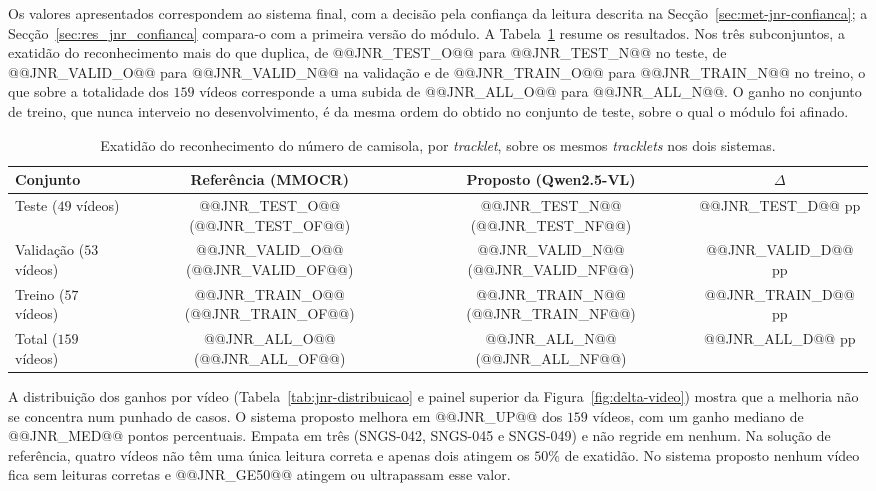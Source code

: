 Os valores apresentados correspondem ao sistema final, com a decisão pela confiança da leitura descrita
na Secção~\ref{sec:met-jnr-confianca}; a Secção~\ref{sec:res_jnr_confianca} compara-o com a primeira
versão do módulo. A Tabela~\ref{tab:jnr} resume os resultados. Nos três subconjuntos, a exatidão do reconhecimento mais
do que duplica, de @@JNR_TEST_O@@ para @@JNR_TEST_N@@ no teste, de @@JNR_VALID_O@@ para
@@JNR_VALID_N@@ na validação e de @@JNR_TRAIN_O@@ para @@JNR_TRAIN_N@@ no treino, o que sobre a
totalidade dos $159$ vídeos corresponde a uma subida de @@JNR_ALL_O@@ para @@JNR_ALL_N@@. O ganho no
conjunto de treino, que nunca interveio no desenvolvimento, é da mesma ordem do obtido no conjunto de
teste, sobre o qual o módulo foi afinado.

\begin{table}[htbp]
    \centering
    \caption{Exatidão do reconhecimento do número de camisola, por \emph{tracklet}, sobre os mesmos
    \emph{tracklets} nos dois sistemas.}
    \label{tab:jnr}
    \begin{tabular}{|l|c|c|c|}
        \hline
        \textbf{Conjunto} & \textbf{Referência (MMOCR)} & \textbf{Proposto (Qwen2.5-VL)} & \textbf{$\Delta$} \\
        \hline
        Teste ($49$ vídeos)     & @@JNR_TEST_O@@ (@@JNR_TEST_OF@@)   & @@JNR_TEST_N@@ (@@JNR_TEST_NF@@)   & @@JNR_TEST_D@@ pp \\
        \hline
        Validação ($53$ vídeos) & @@JNR_VALID_O@@ (@@JNR_VALID_OF@@) & @@JNR_VALID_N@@ (@@JNR_VALID_NF@@) & @@JNR_VALID_D@@ pp \\
        \hline
        Treino ($57$ vídeos)    & @@JNR_TRAIN_O@@ (@@JNR_TRAIN_OF@@) & @@JNR_TRAIN_N@@ (@@JNR_TRAIN_NF@@) & @@JNR_TRAIN_D@@ pp \\
        \hline
        Total ($159$ vídeos)    & @@JNR_ALL_O@@ (@@JNR_ALL_OF@@)     & @@JNR_ALL_N@@ (@@JNR_ALL_NF@@)     & @@JNR_ALL_D@@ pp \\
        \hline
    \end{tabular}
\end{table}

A distribuição dos ganhos por vídeo (Tabela~\ref{tab:jnr-distribuicao} e painel superior da
Figura~\ref{fig:delta-video}) mostra que a melhoria não se concentra num punhado de casos. O
sistema proposto melhora em @@JNR_UP@@ dos $159$ vídeos, com um ganho mediano de @@JNR_MED@@ pontos
percentuais. Empata em três (SNGS-042, SNGS-045 e SNGS-049) e não regride em nenhum. Na solução de referência, quatro
vídeos não têm uma única leitura correta e apenas dois atingem os $50\%$ de exatidão. No sistema
proposto nenhum vídeo fica sem leituras corretas e @@JNR_GE50@@ atingem ou ultrapassam esse valor.

